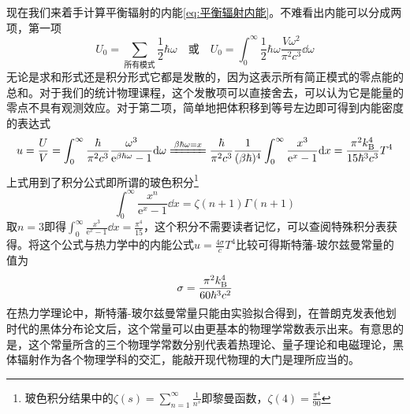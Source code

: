 \documentclass[../../main.tex]{subfiles}
\begin{document}
现在我们来着手计算平衡辐射的内能\eqref{eq:平衡辐射内能}。不难看出内能可以分成两项，第一项
\begin{equation}
    U_0=\sum_{\text{所有模式}}\frac{1}{2}\hbar\omega\quad \text{或}\quad U_0=\int_0^{\infty}\frac{1}{2}\hbar\omega\frac{V\omega^2}{\pi^2c^3}\dd\omega
\end{equation}
无论是求和形式还是积分形式它都是发散的，因为这表示所有简正模式的零点能的总和。对于我们的统计物理课程，这个发散项可以直接舍去，可以认为它是能量的零点不具有观测效应。对于第二项，简单地把体积移到等号左边即可得到内能密度的表达式
\begin{equation}\label{eq:平衡辐射的内能密度}
    u=\frac{U}{V}=\int_0^{\infty}\frac{\hbar}{\pi^2c^3}\frac{\omega^3}{\mathrm{e}^{\beta\hbar\omega}-1}\dd\omega\xlongequal{\beta\hbar\omega=x}\frac{\hbar}{\pi^2c^3}\frac{1}{(\beta\hbar)^4}\int_0^{\infty}\frac{x^3}{\mathrm{e}^x-1}\dd x=\frac{\pi^2\k^4}{15\hbar^3c^3}T^4
\end{equation}
上式用到了积分公式即所谓的玻色积分\footnote{玻色积分结果中的\(\displaystyle \zeta(s)=\sum_{n=1}^{\infty}\frac{1}{n^s}\)即黎曼函数，\(\zeta(4)=\frac{\pi^4}{90}\)}
\begin{equation}
    \int_0^{\infty}\frac{x^n}{\mathrm{e}^x-1}\dd x=\zeta(n+1)\Gamma(n+1)
\end{equation}
取\(n=3\)即得\(\int_0^{\infty}\frac{x^3}{\mathrm{e}^x-1}\dd x=\frac{\pi^4}{15}\)，这个积分不需要读者记忆，可以查阅特殊积分表获得。将这个公式与热力学中的内能公式\(u=\frac{4\sigma}{c}T^4\)比较可得斯特藩-玻尔兹曼常量的值为
\begin{equation}
    \sigma=\frac{\pi^2k_{\mathrm{B}}^4}{60\hbar^3c^2}
\end{equation}
在热力学理论中，斯特藩-玻尔兹曼常量只能由实验拟合得到，在普朗克发表他划时代的黑体分布论文后，这个常量可以由更基本的物理学常数表示出来。有意思的是，这个常量所含的三个物理学常数分别代表着热理论、量子理论和电磁理论，黑体辐射作为各个物理学科的交汇，能敲开现代物理的大门是理所应当的。
\end{document}
